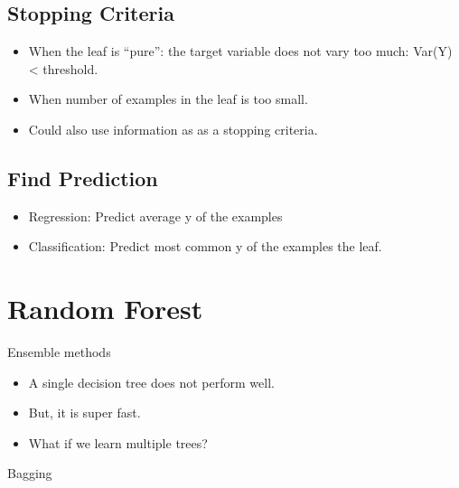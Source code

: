 \documentclass[
]{book}
\providecommand{\tightlist}{%
  \setlength{\itemsep}{0pt}\setlength{\parskip}{0pt}}
\begin{document}
\hypertarget{stopping-criteria}{%
\subsection{Stopping Criteria}\label{stopping-criteria}}

\begin{itemize}
\tightlist
\item
  When the leaf is ``pure'': the target variable does not vary too much: Var(Y) \textless{} threshold.\\
\item
  When number of examples in the leaf is too small.\\
\item
  Could also use information as as a stopping criteria.
\end{itemize}

\hypertarget{find-prediction}{%
\subsection{Find Prediction}\label{find-prediction}}

\begin{itemize}
\tightlist
\item
  Regression: Predict average y of the examples\\
\item
  Classification: Predict most common y of the examples the leaf.
\end{itemize}

\hypertarget{random-forest}{%
\section{Random Forest}\label{random-forest}}

Ensemble methods

\begin{itemize}
\tightlist
\item
  A single decision tree does not perform well.\\
\item
  But, it is super fast.\\
\item
  What if we learn multiple trees?
\end{itemize}

Bagging
\end{document}
